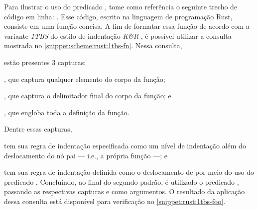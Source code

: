 \documentclass
  [11pt,a4paper,english,brazil,openright,sumario=tradicional,twoside]
  {abntex2}
\begin{document}
  Para ilustrar o uso do predicado ,
  tome como referência o seguinte trecho de código em linha:
  . Esse código, escrito na linguagem
  de programação Rust, consiste em uma função concisa. A fim de formatar essa
  função de acordo com a variante \textit{1TBS} do estilo de indentação
  \textit{K\&R} \cite{wiki-2023-indentation}, é possível utilizar a consulta
  mostrada no \cref{snippet:scheme:rust:1tbs-fn}. Nessa consulta,
  \begin{inparaenum}
    \item estão presentes 3 capturas:
          \begin{inparaenum}
            \item {}, que captura qualquer elemento do
                  corpo da função;
            \item {}, que captura o delimitador final do
                  corpo da função; e
            \item {}, que engloba toda a definição da
                  função.
          \end{inparaenum}
          Dentre essas capturas,
    \item {} tem sua regra de indentação especificada
          como um nível de indentação além do deslocamento do nó pai --- i.e.,
          a própria função ---; e
    \item {} tem sua regra de indentação definida como o
          deslocamento de  por meio do uso do predicado
          . Concluindo, ao final do segundo
          padrão, é utilizado o predicado , passando
          as respectivas capturas  e
           como argumentos. O resultado da aplicação
          dessa consulta está disponível para verificação no
          \cref{snippet:rust:1tbs-foo}.
  \end{inparaenum}
\end{document}
